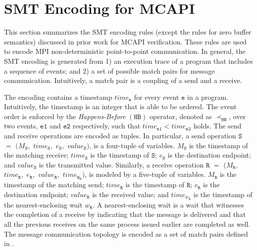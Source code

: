\section{SMT Encoding for MCAPI}
This section summarizes the SMT encoding rules (except the rules for zero buffer semantics) discussed in prior work for MCAPI verification. These rules are used to encode MPI non-deterministic point-to-point communication. In general, the SMT encoding is generated from 1) an execution trace of a program that includes a sequence of events; and 2) a set of possible match pairs for message communication. Intuitively, a match pair is a coupling of a send and a receive. 


The encoding contains a timestamp $\mathit{time}_\mathtt{e}$ for every event $\mathtt{e}$ in a program. Intuitively, the timestamp is an integer that is able to be ordered.  The event order is enforced by the \emph{Happens-Before} $(\mathtt{HB})$ operator, denoted as
$\mathrm{\prec_\mathtt{HB}}$, over two events, $\mathtt{e1}$ and $\mathtt{e2}$ respectively, such that $\mathit{time}_\mathtt{e1} <  \mathit{time}_\mathtt{e2}$ holds. The send and receive operations are encoded as tuples. In particular, a send operation $\mathtt{S}$ $=$ $(M_\mathtt{S},$ $\mathit{time}_\mathtt{S},$ $e_\mathtt{S},$ $\mathit{value}_\mathtt{S})$, is a four-tuple of variables. $M_\mathtt{S}$ is the timestamp of the matching receive; $\mathit{time}_\mathtt{S}$ is the timestamp of $\mathtt{S}$; $e_\mathtt{S}$ is the destination endpoint; and $\mathit{value}_\mathtt{S}$ is the transmitted value. Similarly, a receive operation $\mathtt{R}$ $=$ $(M_\mathtt{R},$ $\mathit{time}_\mathtt{R},$ $e_\mathtt{R},$ $\mathit{value}_\mathtt{R},$ $\mathit{time}_{\mathtt{W}_\mathtt{R}})$, is modeled by a five-tuple of variables. $M_\mathtt{R}$ is the timestamp of the matching send; $\mathit{time}_\mathtt{R}$ is the timestamp of $\mathtt{R}$; $e_\mathtt{R}$ is the destination endpoint; $\mathit{value}_\mathtt{R}$ is the received value; and $\mathit{time}_{\mathit{w}_\mathtt{R}}$ is the timestamp of the nearest-enclosing wait ${\mathit{w}_\mathtt{R}}$. A nearest-enclosing wait is a wait that witnesses the completion of a receive by indicating that the message is delivered and that all the previous receives on the same process issued earlier are completed as well. The message communication topology is encoded as a set of match pairs defined in .

